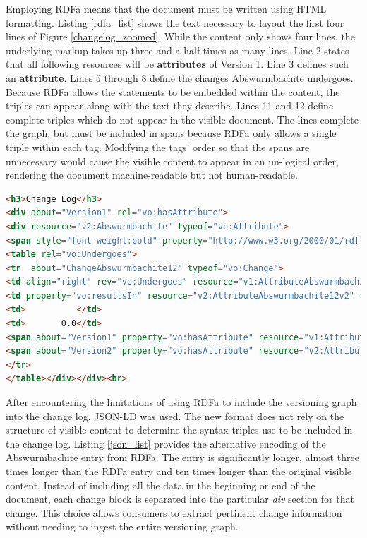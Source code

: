 Employing RDFa means that the document must be written using HTML formatting.
Listing \ref{rdfa_list} shows the text necessary to layout the first four lines of Figure \ref{changelog_zoomed}.
While the content only shows four lines, the underlying markup takes up three and a half times as many lines.
Line 2 states that all following resources will be \textbf{attributes} of Version 1.
Line 3 defines such an \textbf{attribute}.
Lines 5 through 8 define the changes Abswurmbachite undergoes.
Because RDFa allows the statements to be embedded within the content, the triples can appear along with the text they describe.
Lines 11 and 12 define complete triples which do not appear in the visible document.
The lines complete the graph, but must be included in spans because RDFa only allows a single triple within each tag.
Modifying the tags' order so that the spans are unnecessary would cause the visible content to appear in an un-logical order, rendering the document machine-readable but not human-readable.

\begin{lstlisting}[language=HTML, caption=Abswurmbachite RDFa, label=rdfa_list]
<h3>Change Log</h3>
<div about="Version1" rel="vo:hasAttribute">
<div resource="v2:Abswurmbachite" typeof="vo:Attribute">
<span style="font-weight:bold" property="http://www.w3.org/2000/01/rdf-schema#label">Abswurmbachite</span>
<table rel="vo:Undergoes">
<tr  about="ChangeAbswurmbachite12" typeof="vo:Change">
<td align="right" rev="vo:Undergoes" resource="v1:AttributeAbswurmbachite12v1" typeof="vo:Attribute"> 9</td>
<td property="vo:resultsIn" resource="v2:AttributeAbswurmbachite12v2" typeof="vo:Attribute">(12)</td>
<td>          </td>
<td>       0.0</td>
<span about="Version1" property="vo:hasAttribute" resource="v1:AttributeAbswurmbachite12v1"></span>
<span about="Version2" property="vo:hasAttribute" resource="v2:AttributeAbswurmbachite12v2"></span>
</tr>
</table></div></div><br>
\end{lstlisting}

After encountering the limitations of using RDFa to include the versioning graph into the change log, JSON-LD was used.
The new format does not rely on the structure of visible content to determine the syntax triples use to be included in the change log.
Listing \ref{json_list} provides the alternative encoding of the Abswurmbachite entry from RDFa.
The entry is significantly longer, almost three times longer than the RDFa entry and ten times longer than the original visible content.
Instead of including all the data in the beginning or end of the document, each change block is separated into the particular \textit{div} section for that change.
This choice allows consumers to extract pertinent change information without needing to ingest the entire versioning graph.

